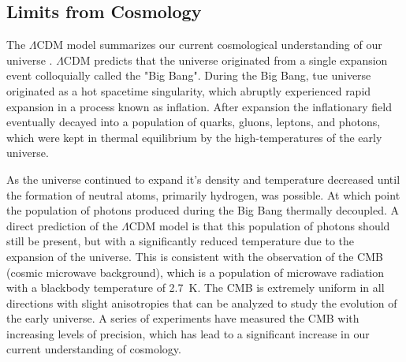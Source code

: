 \subsection{Limits from Cosmology}


The $\Lambda$CDM model summarizes our current cosmological understanding of our universe \cite{Workman:2022ynf}. $\Lambda$CDM predicts that the universe originated from a single expansion event colloquially called the "Big Bang". During the Big Bang, tue universe originated as a hot spacetime singularity, which abruptly experienced rapid expansion in a process known as inflation. After expansion the inflationary field eventually decayed into a population of quarks, gluons, leptons, and photons, which were kept in thermal equilibrium by the high-temperatures of the early universe.

As the universe continued to expand it's density and temperature decreased until the formation of neutral atoms, primarily hydrogen, was possible. At which point the population of photons produced during the Big Bang thermally decoupled. A direct prediction of the $\Lambda$CDM model is that this population of photons should still be present, but with a significantly reduced temperature due to the expansion of the universe. This is consistent with the observation of the CMB (cosmic microwave background), which is a population of microwave radiation with a blackbody temperature of 2.7~K. The CMB is extremely uniform in all directions with slight anisotropies that can be analyzed to study the evolution of the early universe. A series of experiments have measured the CMB with increasing levels of precision, which has lead to a significant increase in our current understanding of cosmology.


